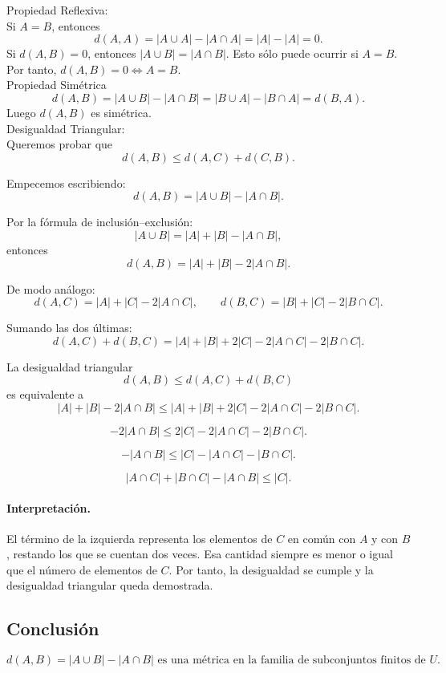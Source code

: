 \documentclass[12pt]{article}
\begin{document}
Propiedad Reflexiva: \\
Si $A=B$, entonces 
\[
d(A,A) = |A \cup A| - |A \cap A| = |A| - |A| = 0.
\]
Si $d(A,B)=0$, entonces $|A \cup B| = |A \cap B|$.  
Esto sólo puede ocurrir si $A=B$.  
Por tanto, $d(A,B)=0 \iff A=B$. \\

Propiedad Simétrica
\[
d(A,B) = |A \cup B| - |A \cap B| = |B \cup A| - |B \cap A| = d(B,A).
\]
Luego $d(A,B)$ es simétrica. \\

Desigualdad Triangular: \\
Queremos probar que
\[
d(A,B) \le d(A,C) + d(C,B).
\]

Empecemos escribiendo:
\[
d(A,B) = |A \cup B| - |A \cap B|.
\]

Por la fórmula de inclusión–exclusión:
\[
|A \cup B| = |A| + |B| - |A \cap B|,
\]
entonces
\[
d(A,B) = |A| + |B| - 2|A \cap B|.
\]

De modo análogo:
\[
d(A,C) = |A| + |C| - 2|A \cap C|, \qquad
d(B,C) = |B| + |C| - 2|B \cap C|.
\]

Sumando las dos últimas:
\[
d(A,C) + d(B,C) = |A| + |B| + 2|C| - 2|A \cap C| - 2|B \cap C|.
\]

La desigualdad triangular
\[
d(A,B) \le d(A,C) + d(B,C)
\]
es equivalente a
\[
|A| + |B| - 2|A \cap B| \le |A| + |B| + 2|C| - 2|A \cap C| - 2|B \cap C|.
\]

\[
-2|A \cap B| \le 2|C| - 2|A \cap C| - 2|B \cap C|.
\]

\[
-|A \cap B| \le |C| - |A \cap C| - |B \cap C|.
\]

\[
|A \cap C| + |B \cap C| - |A \cap B| \le |C|.
\]

\paragraph{Interpretación.}
El término de la izquierda representa los elementos de $C$ en común con $A$ y con $B$, restando los que se cuentan dos veces.  
Esa cantidad siempre es menor o igual que el número de elementos de $C$.  
Por tanto, la desigualdad se cumple y la desigualdad triangular queda demostrada.

\subsection*{Conclusión}
\[
\boxed{
d(A,B)=|A \cup B| - |A \cap B| \text{ es una métrica en la familia de subconjuntos finitos de } U.
}
\]
\end{document}
